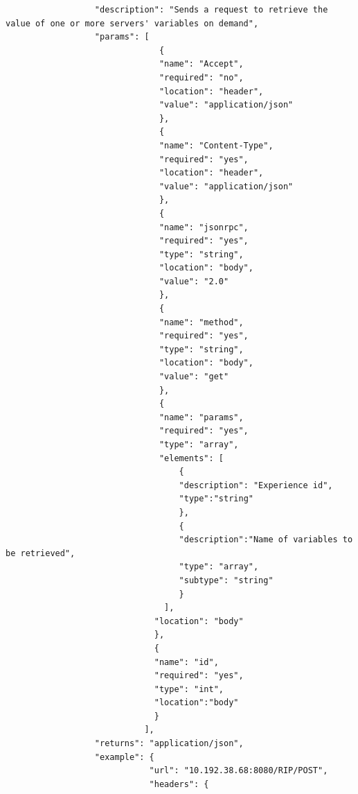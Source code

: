 \begin{lstlisting}
                  "description": "Sends a request to retrieve the value of one or more servers' variables on demand",
                  "params": [
                               {
                               "name": "Accept",
                               "required": "no",
                               "location": "header",
                               "value": "application/json"
                               },
                               {
                               "name": "Content-Type",
                               "required": "yes",
                               "location": "header",
                               "value": "application/json"
                               },
                               {
                               "name": "jsonrpc",
                               "required": "yes",
                               "type": "string",
                               "location": "body",
                               "value": "2.0"
                               },
                               {
                               "name": "method",
                               "required": "yes",
                               "type": "string",
                               "location": "body",
                               "value": "get"
                               },
                               {
                               "name": "params",
                               "required": "yes",
                               "type": "array",
                               "elements": [
                                   {
                                   "description": "Experience id",
                                   "type":"string"
                                   },
                                   {
                                   "description":"Name of variables to be retrieved",
                                   "type": "array",
                                   "subtype": "string"
                                   }
                                ],
                              "location": "body"
                              },
                              {
                              "name": "id",
                              "required": "yes",
                              "type": "int",
                              "location":"body"
                              }
                            ],
                  "returns": "application/json",
                  "example": {
                             "url": "10.192.38.68:8080/RIP/POST",
                             "headers": {

\end{lstlisting}
